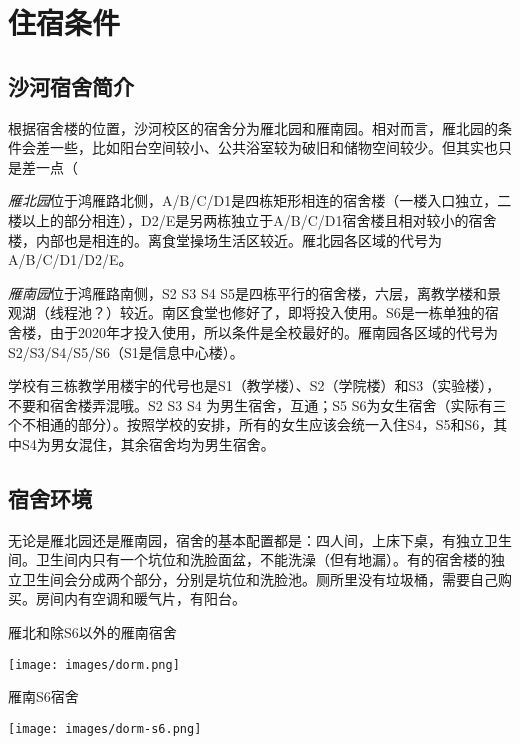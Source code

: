 \section{住宿条件}

\subsection{沙河宿舍简介}

根据宿舍楼的位置，沙河校区的宿舍分为雁北园和雁南园。相对而言，雁北园的条件会差一些，比如阳台空间较小、公共浴室较为破旧和储物空间较少。但其实也只是差一点（

\emph{雁北园}位于鸿雁路北侧，A/B/C/D1是四栋矩形相连的宿舍楼（一楼入口独立，二楼以上的部分相连），D2/E是另两栋独立于A/B/C/D1宿舍楼且相对较小的宿舍楼，内部也是相连的。离食堂操场生活区较近。雁北园各区域的代号为A/B/C/D1/D2/E。

\emph{雁南园}位于鸿雁路南侧，S2 S3 S4 S5是四栋平行的宿舍楼，六层，离教学楼和景观湖（线程池？）较近。南区食堂也修好了，即将投入使用。S6是一栋单独的宿舍楼，由于2020年才投入使用，所以条件是全校最好的。雁南园各区域的代号为S2/S3/S4/S5/S6（S1是信息中心楼）。

学校有三栋教学用楼宇的代号也是S1（教学楼）、S2（学院楼）和S3（实验楼），不要和宿舍楼弄混哦。S2 S3 S4 为男生宿舍，互通；S5 S6为女生宿舍（实际有三个不相通的部分）。按照学校的安排，所有的女生应该会统一入住S4，S5和S6，其中S4为男女混住，其余宿舍均为男生宿舍。

\subsection{宿舍环境}

无论是雁北园还是雁南园，宿舍的基本配置都是：四人间，上床下桌，有独立卫生间。卫生间内只有一个坑位和洗脸面盆，不能洗澡（但有地漏）。有的宿舍楼的独立卫生间会分成两个部分，分别是坑位和洗脸池。厕所里没有垃圾桶，需要自己购买。房间内有空调和暖气片，有阳台。

\begin{center}
    \begin{minipage}{0.45\textwidth}
        \centerline{\sffamily\small 雁北和除S6以外的雁南宿舍}
        \centerline{\texttt{[image: images/dorm.png]}}
    \end{minipage}
    \qquad
    \begin{minipage}{0.45\textwidth}
        \centerline{\sffamily\small 雁南S6宿舍}
        \centerline{\texttt{[image: images/dorm-s6.png]}}
    \end{minipage}
\end{center}

